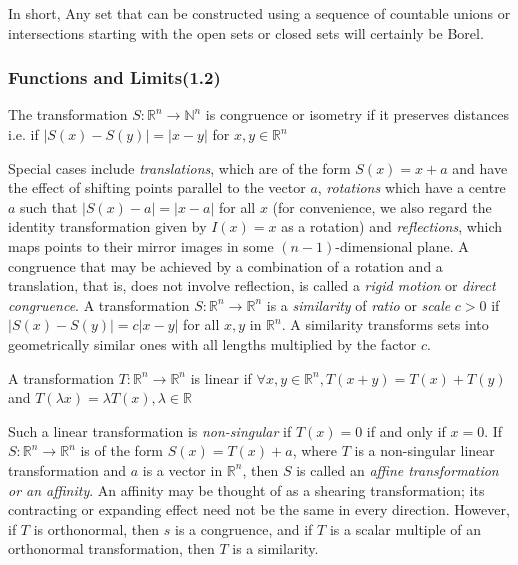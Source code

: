 In short, Any set that can be constructed using a sequence of countable unions or intersections starting with the open sets or closed sets will certainly be Borel.

\subsubsection{Functions and Limits(1.2)}

\begin{definition}[Congruence]
    The transformation $S : \mathbb{R}^n\rightarrow \mathbb{N}^n$ is congruence or isometry if it preserves distances i.e. if $|S(x)-S(y)| = |x-y|$ for $x, y\in \mathbb{R}^n$
    
\end{definition}

Special cases include \textit{translations}, which are of the form 
$S(x)=x+a$ and have the effect of shifting points parallel 
to the vector $a$, \textit{rotations} which have a centre $a$ such 
that $|S(x)-a|=|x-a|$ for all $x$ (for convenience, we also 
regard the identity transformation given by $I(x)=x$ as a 
rotation) and \textit{reflections}, which maps points to their mirror 
images in some $(n-1)$-dimensional plane. A congruence that 
may be achieved by a combination of a rotation and a translation, 
that is, does not involve reflection, is called a \textit{rigid motion} or 
\textit{direct congruence}. A transformation 
$S: \mathbb{R}^{n} \rightarrow \mathbb{R}^{n}$ is a \textit{similarity} of 
\textit{ratio} or \textit{scale} $c>0$ if $|S(x)-S(y)|=c|x-y|$ for all $x, y$ 
in $\mathbb{R}^{n} .$ A similarity transforms sets into geometrically 
similar ones with all lengths multiplied by the factor $c$.

\begin{definition}
    A transformation $T : \mathbb{R}^n \rightarrow \mathbb{R}^n$ is linear 
    if $\forall x, y \in \mathbb{R}^n, T(x+y) = T(x) + T(y)$ and 
    $T(\lambda x) = \lambda T(x), \lambda \in\mathbb{R}$ 
\end{definition}

Such a linear transformation is \textit{non-singular} if $T(x)=0$ if and only if $x=0 .$ If 
$S: \mathbb{R}^{n} \rightarrow \mathbb{R}^{n}$ is of the form $S(x)=T(x)+a$, 
where $T$ is a non-singular linear transformation and $a$ is a vector in 
$\mathbb{R}^{n}$, then $S$ is called an \textit{affine transformation}\textit{ or an 
affinity}. An affinity may be thought of as a shearing transformation; 
its contracting or expanding effect need not be the same in every direction. 
However, if $T$ is orthonormal, then $s$ is a congruence, and if $T$ is a 
scalar multiple of an orthonormal transformation, then $T$ is a similarity.

